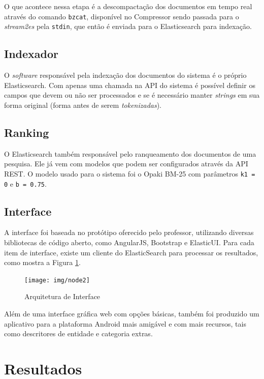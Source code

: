 \documentclass[12pt]{article}
\begin{document}
O que acontece nessa etapa é a descompactação dos documentos em tempo real através do comando \texttt{bzcat}, disponível no Compressor sendo passada para o \emph{stream2es} pela \texttt{stdin}, que então é enviada para o Elasticsearch para indexação.

\subsection{Indexador}

O \emph{software} responsável pela indexação dos documentos do sistema é o próprio Elasticsearch. Com apenas uma chamada na API do sistema é possível definir os campos que devem ou não ser processados e se é necessário manter \emph{strings} em sua forma original (forma antes de serem \emph{tokenizadas}).

\subsection{Ranking}
\label{ranking}

O Elasticsearch também responsável pelo ranqueamento dos documentos de uma pesquisa. Ele já vem com modelos que podem ser configurados através da API REST. O modelo usado para o sistema foi o Opaki BM-25 com parâmetros \texttt{k1 = 0} e \texttt{b = 0.75}.

\subsection{Interface}

A interface foi baseada no protótipo oferecido pelo professor, utilizando diversas bibliotecas de código aberto, como AngularJS, Bootstrap e ElasticUI. Para cada item de interface, existe um cliente do ElasticSearch para processar os resultados, como mostra a Figura \ref{interface}.

\begin{figure}
    \centering
    \texttt{[image: img/node2]}
    \caption{Arquitetura de Interface}
    \label{interface}
\end{figure}

Além de uma interface gráfica web com opções básicas, também foi produzido um aplicativo para a plataforma Android mais amigável e com mais recursos, tais como descritores de entidade e categoria extras.

\section{Resultados}
\end{document}
